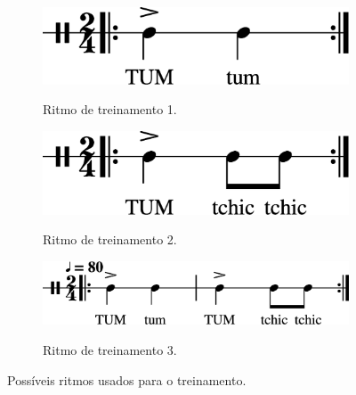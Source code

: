 \begin{figure}[ht]
\centering
\begin{subfigure}{.475\textwidth}
  \centering
  \href{https://drive.google.com/file/d/1D6OyfCPIi9NsxY-05g6WT9oALq0F8DkF/view?usp=sharing}{\includegraphics[width=.9\linewidth]{chapters/cap-musicalidade/timing0-1.eps}}
  \caption{Ritmo de treinamento 1.}
  \label{fig:ex:timing:a}
\end{subfigure}
\hfill	
\begin{subfigure}{.475\textwidth}
  \centering
  \href{https://drive.google.com/file/d/11MRkNSD__8f8AJzaKKqJr1KwBE2w2SQm/view?usp=sharing}{\includegraphics[width=.9\linewidth]{chapters/cap-musicalidade/timing1-1.eps}}
  \caption{Ritmo de treinamento 2.}
  \label{fig:ex:timing:b}
\end{subfigure}
\begin{subfigure}{.675\textwidth}
  \centering
  \href{https://drive.google.com/file/d/1kV5VB03zV9CDgNSPh1XTog_OisQVSuXQ/view?usp=sharing}{\includegraphics[width=.9\linewidth]{chapters/cap-musicalidade/timing2-1.eps}}
  \caption{Ritmo de treinamento 3.}
  \label{fig:ex:timing:c}
\end{subfigure}
\caption{Possíveis ritmos usados para o treinamento.}
\label{fig:ex:timing}
\end{figure}

